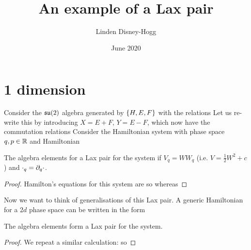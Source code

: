 \documentclass{article}
\title{An example of a Lax pair}
\author{Linden Disney-Hogg}
\date{June 2020}
\begin{document}
\maketitle

\section{1 dimension}
Consider the $\mathfrak{su}(2)$ algebra generated by $\left\{ H,E,F \right\}$ with the relations
Let us re-write this by introducing $X=E+F, \, Y=E-F$, which now have the commutation relations 
Consider the Hamiltonian system with phase space $q,p \in \mathbb{R}$ and Hamiltonian 
\begin{prop}
	The algebra elements 
for a Lax pair for the system if $V_q = WW_q$ (i.e. $V = \frac{1}{2}W^2 + c$) and $\cdot_{q} = \partial_q \cdot$. 
\end{prop}
\begin{proof}
	Hamilton's equations for this system are 
so 
whereas 
\end{proof}
Now we want to think of generalisations of this Lax pair. A generic Hamiltonian for a $2d$ phase space can be written in the form 
\begin{prop}
	The algebra elements 
	form a Lax pair for the system.
\end{prop}
\begin{proof}
	We repeat a similar calculation: 
so 
\end{proof}
\end{document}
